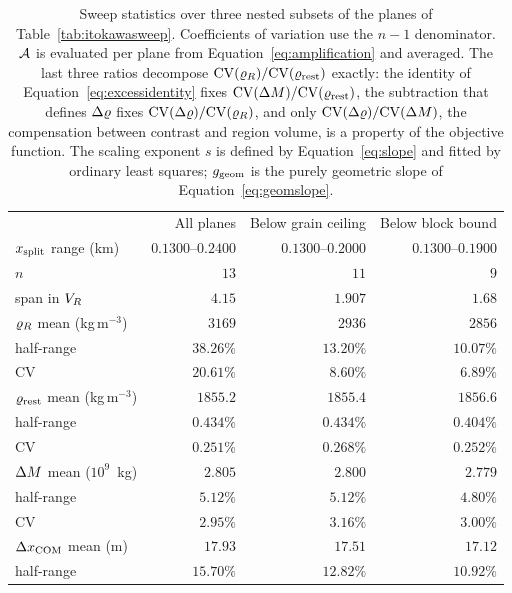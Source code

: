 \begin{table}[htbp]
\centering
\small
\setlength{\tabcolsep}{5pt}
\caption{Sweep statistics over three nested subsets of the planes of
Table~\ref{tab:itokawasweep}. Coefficients of variation use the $n-1$
denominator. $\mathcal{A}$ is evaluated per plane from
Equation~\eqref{eq:amplification} and averaged. The last three
ratios decompose $\mathrm{CV}(\varrho_{R})/\mathrm{CV}(\varrho_{\mathrm{rest}})$ exactly: the identity of
Equation~\eqref{eq:excessidentity} fixes $\mathrm{CV}(\Delta M)/\mathrm{CV}(\varrho_{\mathrm{rest}})$,
the subtraction that defines $\Delta\varrho$ fixes $\mathrm{CV}(\Delta\varrho)/\mathrm{CV}(\varrho_{R})$,
and only $\mathrm{CV}(\Delta\varrho)/\mathrm{CV}(\Delta M)$, the compensation between contrast and
region volume, is a property of the objective function. The scaling exponent $s$ is
defined by Equation~\eqref{eq:slope} and fitted by ordinary least squares;
$g_{\mathrm{geom}}$ is the purely geometric slope of
Equation~\eqref{eq:geomslope}.}
\label{tab:subsets}
\begin{tabular}{lrrr}
\toprule
 & All planes & Below grain ceiling & Below block bound \\
$x_{\mathrm{split}}$ range (km) & $0.1300$--$0.2400$ & $0.1300$--$0.2000$ & $0.1300$--$0.1900$ \\
$n$ & $13$ & $11$ & $9$ \\
span in $V_{R}$ & $4.15$ & $\mathbf{1.907}$ & $1.68$ \\
\midrule
$\varrho_{R}$ mean (kg\,m$^{-3}$)      & $3169$   & $2936$   & $2856$ \\
\quad half-range                  & $38.26\%$ & $13.20\%$ & $10.07\%$ \\
\quad CV                          & $20.61\%$ & $8.60\%$  & $6.89\%$ \\
\midrule
$\varrho_{\mathrm{rest}}$ mean (kg\,m$^{-3}$)   & $1855.2$ & $1855.4$ & $1856.6$ \\
\quad half-range                  & $0.434\%$ & $0.434\%$ & $0.404\%$ \\
\quad CV                          & $0.251\%$ & $0.268\%$ & $0.252\%$ \\
\midrule
$\Delta M$ mean ($10^{9}$~kg)       & $2.805$  & $2.800$  & $2.779$ \\
\quad half-range                  & $5.12\%$  & $5.12\%$  & $4.80\%$ \\
\quad CV                          & $2.95\%$  & $3.16\%$  & $3.00\%$ \\
\midrule
$\Delta x_{\mathrm{COM}}$ mean (m)                  & $17.93$  & $17.51$  & $17.12$ \\
\quad half-range                  & $15.70\%$ & $12.82\%$ & $10.92\%$ \\

\end{tabular}
\end{table}
